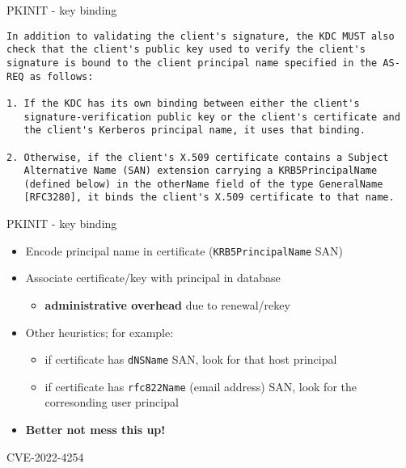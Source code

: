 \documentclass[ignorenonframetext,aspectratio=169,12pt]{beamer}
\begin{document}
\begin{frame}[fragile]{PKINIT - key binding}
\protect\hypertarget{pkinit-key-binding-1}{}
\small
\begin{verbatim}
In addition to validating the client's signature, the KDC MUST also
check that the client's public key used to verify the client's
signature is bound to the client principal name specified in the AS-
REQ as follows:

1. If the KDC has its own binding between either the client's
   signature-verification public key or the client's certificate and
   the client's Kerberos principal name, it uses that binding.

2. Otherwise, if the client's X.509 certificate contains a Subject
   Alternative Name (SAN) extension carrying a KRB5PrincipalName
   (defined below) in the otherName field of the type GeneralName
   [RFC3280], it binds the client's X.509 certificate to that name.
\end{verbatim}
\end{frame}

\begin{frame}{PKINIT - key binding}
\protect\hypertarget{pkinit-key-binding-2}{}
\begin{itemize}
    \item Encode principal name in certificate ({\tt KRB5PrincipalName} SAN)
    \item Associate certificate/key with principal in database
        \begin{itemize}
            \item {\bf administrative overhead} due to renewal/rekey 
        \end{itemize}
    \item Other heuristics; for example:
        \begin{itemize}
            \item if certificate has {\tt dNSName} SAN,
                look for that host principal
            \item if certificate has {\tt rfc822Name} (email address) SAN,
                look for the corresonding user principal
        \end{itemize}
    \item {\bf Better not mess this up!}
\end{itemize}
\end{frame}



\begin{frame}[plain]
\centering
\huge CVE-2022-4254
\end{frame}
\end{document}
